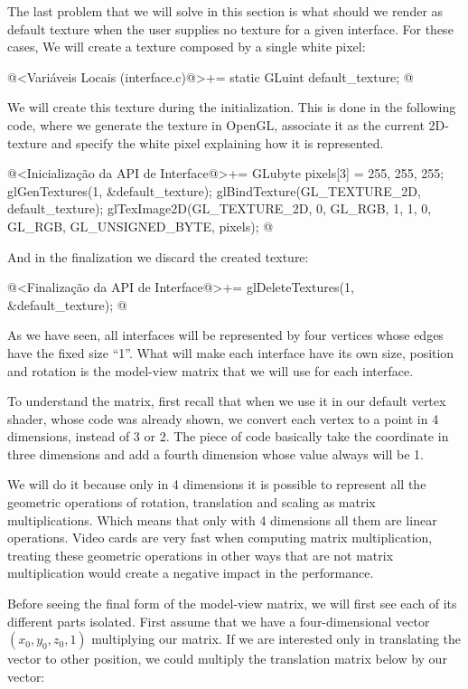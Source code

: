 The last problem that we will solve in this section is what should we
render as default texture when the user supplies no texture for a
given interface. For these cases, We will create a texture composed by
a single white pixel:

\iniciocodigo
@<Variáveis Locais (interface.c)@>+=
static GLuint default_texture;
@
\fimcodigo

We will create this texture during the initialization. This is done in
the following code, where we generate the texture in OpenGL, associate
it as the current 2D-texture and specify the white pixel explaining
how it is represented.

\iniciocodigo
@<Inicialização da API de Interface@>+=
{
  GLubyte pixels[3] = {255, 255, 255};
  glGenTextures(1, &default_texture);
  glBindTexture(GL_TEXTURE_2D, default_texture);
  glTexImage2D(GL_TEXTURE_2D, 0, GL_RGB, 1, 1, 0, GL_RGB, GL_UNSIGNED_BYTE,
               pixels);
}
@
\fimcodigo

And in the finalization we discard the created texture:

\iniciocodigo
@<Finalização da API de Interface@>+=
glDeleteTextures(1, &default_texture);
@
\fimcodigo


As we have seen, all interfaces will be represented by four vertices
whose edges have the fixed size ``1''. What will make each interface
have its own size, position and rotation is the model-view matrix that
we will use for each interface.

To understand the matrix, first recall that when we use it in our
default vertex shader, whose code was already shown, we convert each
vertex to a point in 4 dimensions, instead of 3 or 2. The piece of
code  basically take the
coordinate in three dimensions and add a fourth dimension whose value
always will be 1.

We will do it because only in 4 dimensions it is possible to represent
all the geometric operations of rotation, translation and scaling as
matrix multiplications. Which means that only with 4 dimensions all
them are linear operations. Video cards are very fast when computing
matrix multiplication, treating these geometric operations in other
ways that are not matrix multiplication would create a negative impact
in the performance.

Before seeing the final form of the model-view matrix, we will first
see each of its different parts isolated. First assume that we have a
four-dimensional vector $(x_0, y_0, z_0, 1)$ multiplying our
matrix. If we are interested only in translating the vector to other
position, we could multiply the translation matrix below by our
vector:

